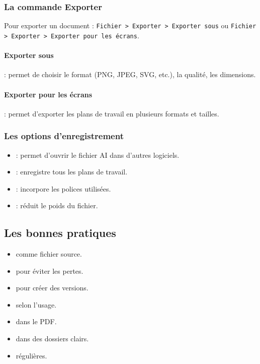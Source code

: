 \subsubsection{La commande Exporter}

Pour exporter un document : \texttt{Fichier > Exporter > Exporter sous} ou \texttt{Fichier > Exporter > Exporter pour les écrans}.

\paragraph{Exporter sous} : permet de choisir le format (PNG, JPEG, SVG, etc.), la qualité, les dimensions.

\paragraph{Exporter pour les écrans} : permet d'exporter les plans de travail en plusieurs formats et tailles.

\subsubsection{Les options d'enregistrement}

\begin{itemize}
    \item {} : permet d'ouvrir le fichier AI dans d'autres logiciels.
    \item {} : enregistre tous les plans de travail.
    \item {} : incorpore les polices utilisées.
    \item {} : réduit le poids du fichier.
\end{itemize}

\subsection{Les bonnes pratiques}

\begin{itemize}
    \item {} comme fichier source.
    \item {} pour éviter les pertes.
    \item {} pour créer des versions.
    \item {} selon l'usage.
    \item {} dans le PDF.
    \item {} dans des dossiers clairs.
    \item {} régulières.
\end{itemize}


